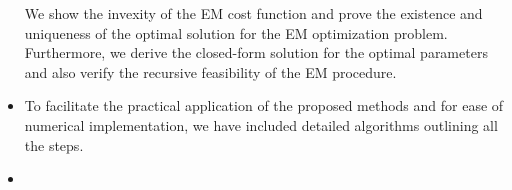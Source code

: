 \begin{itemize}
    We show the invexity of the EM cost function and prove the existence and uniqueness of the optimal solution for the EM optimization problem. Furthermore, we derive the closed-form solution for the optimal parameters and also verify the recursive feasibility of the EM procedure.    
    \item 
    To facilitate the practical application of the proposed methods and for ease of numerical implementation, we have included detailed algorithms outlining all the steps.
    \item

\end{itemize}
